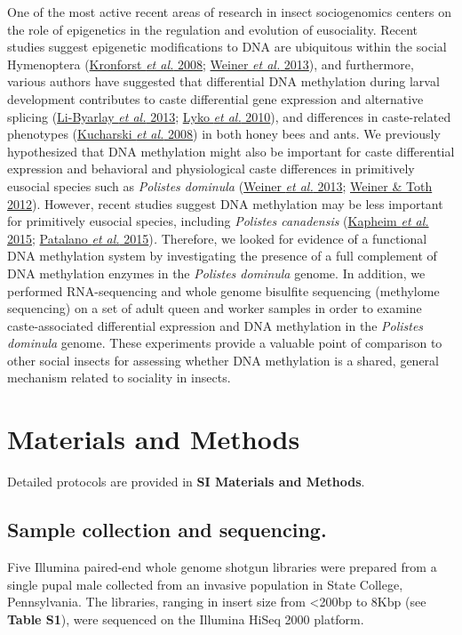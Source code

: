 One of the most active recent areas of research in insect sociogenomics
centers on the role of epigenetics in the regulation and evolution of
eusociality. Recent studies suggest epigenetic modifications to DNA are
ubiquitous within the social Hymenoptera
(\protect\hyperlink{ux5fENREFux5f26}{Kronforst \textit{et al.} 2008};
\protect\hyperlink{ux5fENREFux5f67}{Weiner \textit{et al.} 2013}), and
furthermore, various authors have suggested that differential DNA
methylation during larval development contributes to caste differential
gene expression and alternative splicing
(\protect\hyperlink{ux5fENREFux5f32}{Li-Byarlay \textit{et al.} 2013};
\protect\hyperlink{ux5fENREFux5f33}{Lyko \textit{et al.} 2010}), and
differences in caste-related phenotypes
(\protect\hyperlink{ux5fENREFux5f28}{Kucharski \textit{et al.} 2008}) in
both honey bees and ants. We previously hypothesized that DNA
methylation might also be important for caste differential expression
and behavioral and physiological caste differences in primitively
eusocial species such as \textit{Polistes dominula}
(\protect\hyperlink{ux5fENREFux5f67}{Weiner \textit{et al.} 2013};
\protect\hyperlink{ux5fENREFux5f68}{Weiner \& Toth 2012}). However,
recent studies suggest DNA methylation may be less important for
primitively eusocial species, including \textit{Polistes canadensis}
(\protect\hyperlink{ux5fENREFux5f24}{Kapheim \textit{et al.} 2015};
\protect\hyperlink{ux5fENREFux5f43}{Patalano \textit{et al.}
2015})\textit{.} Therefore, we looked for evidence of a functional DNA
methylation system by investigating the presence of a full complement of
DNA methylation enzymes in the \textit{Polistes dominula} genome. In
addition, we performed RNA-sequencing and whole genome bisulfite
sequencing (methylome sequencing) on a set of adult queen and worker
samples in order to examine caste-associated differential expression and
DNA methylation in the \textit{Polistes dominula} genome. These
experiments provide a valuable point of comparison to other social
insects for assessing whether DNA methylation is a shared, general
mechanism related to sociality in insects.

\section{Materials and Methods}

Detailed protocols are provided in \textbf{SI Materials and Methods}.

\subsection{Sample collection and sequencing.} Five Illumina paired-end
whole genome shotgun libraries were prepared from a single pupal male
collected from an invasive population in State College, Pennsylvania.
The libraries, ranging in insert size from \textless{}200bp to 8Kbp (see
\textbf{Table S1}), were sequenced on the Illumina HiSeq 2000 platform.

